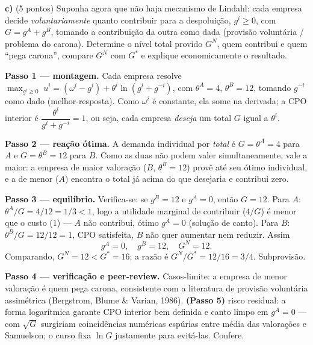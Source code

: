 \textbf{c)} (5 pontos) Suponha agora que n\~ao haja mecanismo de Lindahl: cada empresa decide \emph{voluntariamente} quanto contribuir para a despolui\c{c}\~ao, $g^i\ge 0$, com $G=g^A+g^B$, tomando a contribui\c{c}\~ao da outra como dada (provis\~ao volunt\'aria / problema do carona). Determine o n\'ivel total provido $G^N$, quem contribui e quem ``pega carona'', compare $G^N$ com $G^{*}$ e explique economicamente o resultado.
\resolucaobox{7.2cm}
\begin{solucao}
\textbf{Passo 1 --- montagem.} Cada empresa resolve $\max_{g^i\ge 0}\;u^i=(\omega^i-g^i)+\theta^i\ln(g^i+g^{-i})$, com $\theta^A=4$, $\theta^B=12$, tomando $g^{-i}$ como dado (melhor-resposta). Como $\omega^i$ \'e constante, ela some na derivada; a CPO interior \'e $\dfrac{\theta^i}{g^i+g^{-i}}=1$, ou seja, cada empresa \emph{deseja} um total $G$ igual a $\theta^i$.

\textbf{Passo 2 --- rea\c{c}\~ao \'otima.} A demanda individual por \emph{total} \'e $G=\theta^A=4$ para $A$ e $G=\theta^B=12$ para $B$. Como as duas n\~ao podem valer simultaneamente, vale a maior: a empresa de maior valora\c{c}\~ao ($B$, $\theta^B=12$) provê at\'e seu \'otimo individual, e a de menor ($A$) encontra o total j\'a acima do que desejaria e contribui zero.

\textbf{Passo 3 --- equil\'ibrio.} Verifica-se: se $g^B=12$ e $g^A=0$, ent\~ao $G=12$. Para $A$: $\theta^A/G=4/12=1/3<1$, logo a utilidade marginal de contribuir ($4/G$) \'e menor que o custo ($1$) --- $A$ n\~ao contribui, \'otimo $g^A=0$ (solu\c{c}\~ao de canto). Para $B$: $\theta^B/G=12/12=1$, CPO satisfeita, $B$ n\~ao quer aumentar nem reduzir. Assim
\[
g^A=0,\quad g^B=12,\quad G^N=12.
\]
Comparando, $G^N=12<G^{*}=16$; a raz\~ao \'e $G^N/G^{*}=12/16=3/4$. Subprovis\~ao.

\textbf{Passo 4 --- verifica\c{c}\~ao e peer-review.} Casos-limite: a empresa de menor valora\c{c}\~ao \'e quem pega carona, consistente com a literatura de provis\~ao volunt\'aria assim\'etrica (Bergstrom, Blume \& Varian, 1986). \textbf{(Passo 5)} risco residual: a forma logar\'itmica garante CPO interior bem definida e canto limpo em $g^A=0$ --- com $\sqrt{G}$ surgiriam coincid\^encias num\'ericas esp\'urias entre m\'edia das valora\c{c}\~oes e Samuelson; o curso fixa $\ln G$ justamente para evit\'a-las. Confere.


\end{solucao}
